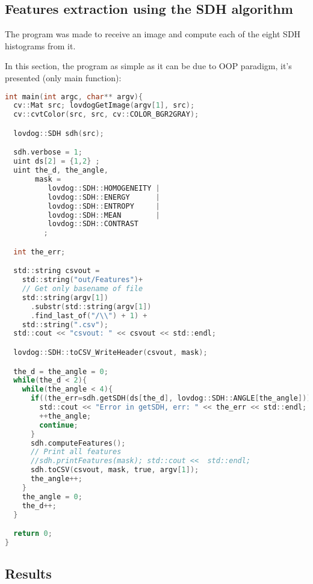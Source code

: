 \subsection{Features extraction using the SDH algorithm}
The program was made to receive an image and compute each of the
eight SDH histograms from it.

In this section, the program as simple as it can be due to OOP
paradigm, it's presented (only main function):

\begin{file}
  \begin{lstlisting}[language=C]
int main(int argc, char** argv){
  cv::Mat src; lovdogGetImage(argv[1], src);
  cv::cvtColor(src, src, cv::COLOR_BGR2GRAY);

  lovdog::SDH sdh(src);

  sdh.verbose = 1;
  uint ds[2] = {1,2} ;
  uint the_d, the_angle,
       mask =
          lovdog::SDH::HOMOGENEITY |
          lovdog::SDH::ENERGY      |
          lovdog::SDH::ENTROPY     |
          lovdog::SDH::MEAN        |
          lovdog::SDH::CONTRAST
         ;

  int the_err;

  std::string csvout =
    std::string("out/Features")+
    // Get only basename of file
    std::string(argv[1])
      .substr(std::string(argv[1])
      .find_last_of("/\\") + 1) +
    std::string(".csv");
  std::cout << "csvout: " << csvout << std::endl;

  lovdog::SDH::toCSV_WriteHeader(csvout, mask);

  the_d = the_angle = 0;
  while(the_d < 2){
    while(the_angle < 4){
      if((the_err=sdh.getSDH(ds[the_d], lovdog::SDH::ANGLE[the_angle]))){
        std::cout << "Error in getSDH, err: " << the_err << std::endl;
        ++the_angle;
        continue;
      }
      sdh.computeFeatures();
      // Print all features
      //sdh.printFeatures(mask); std::cout <<  std::endl;
      sdh.toCSV(csvout, mask, true, argv[1]);
      the_angle++;
    }
    the_angle = 0;
    the_d++;
  }

  return 0;
}
  \end{lstlisting}
\end{file}

\subsection{Results}


